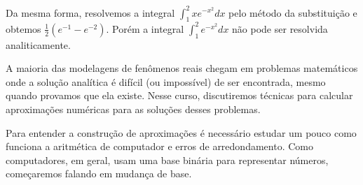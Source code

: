 Da mesma forma, resolvemos a integral
$
\int_1^2xe^{-x^2}dx
$
pelo método da substituição e obtemos $\frac{1}{2}(e^{-1}-e^{-2})$. Porém a integral
$
\int_1^2 e^{-x^2} dx
$
não pode ser resolvida analiticamente.

A maioria das modelagens de fenômenos reais chegam em problemas matemáticos onde a solução analítica é difícil (ou impossível) de ser encontrada, mesmo quando provamos que ela existe. Nesse curso, discutiremos técnicas para calcular aproximações numéricas para as soluções desses problemas.

Para entender a construção de aproximações é necessário estudar um pouco como funciona a aritmética de computador e erros de arredondamento. Como computadores, em geral, usam uma base binária para representar números, começaremos falando em mudança de base.
